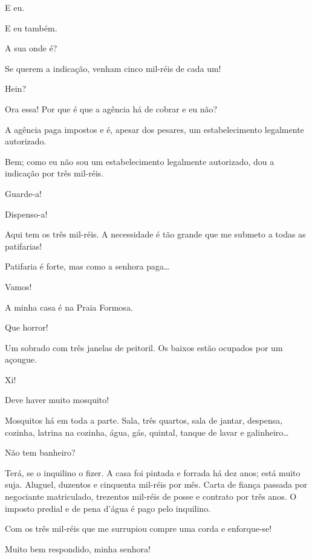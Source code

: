  E eu.

 E eu também.

 A sua onde é?

 Se querem a indicação, venham cinco mil-réis de cada um!

 Hein?

 Ora essa! Por que é que a agência há de cobrar e eu não?

 A agência paga impostos e é, apesar dos pesares, um estabelecimento
legalmente autorizado.

 Bem; como eu não sou um estabelecimento legalmente
autorizado, dou a indicação por três mil-réis.

 Guarde-a!

 Dispenso-a!

 Aqui tem os três mil-réis. A necessidade é tão grande que me
submeto a todas as patifarias!

  Patifaria é forte, mas como a senhora paga\ldots{}

 Vamos!

 A minha casa é na Praia Formosa.

 Que horror!

 Um sobrado com três janelas de peitoril. Os baixos estão
ocupados por um açougue.

 Xi!

 Deve haver muito mosquito!

 Mosquitos há em toda a parte. Sala, três quartos, sala de
jantar, despensa, cozinha, latrina na cozinha, água, gás, quintal, tanque de lavar
e galinheiro\ldots{}

 Não tem banheiro?

 Terá, se o inquilino o fizer. A casa foi pintada e forrada
há dez anos; está muito suja. Aluguel, duzentos e cinquenta mil-réis por mês.
Carta de fiança passada por negociante matriculado, trezentos mil-réis de posse e
contrato por três anos. O imposto predial e de pena d’água é pago pelo inquilino.

 Com os três mil-réis que me surrupiou compre uma corda e
enforque-se! 

  Muito bem respondido, minha senhora!

